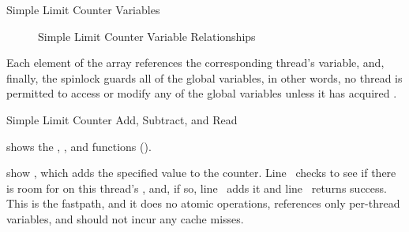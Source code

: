 \begin{listing}

\caption{Simple Limit Counter Variables}
\label{lst:count:Simple Limit Counter Variables}
\end{listing}

\begin{figure}
\centering
{}
\caption{Simple Limit Counter Variable Relationships}
\label{fig:count:Simple Limit Counter Variable Relationships}
\end{figure}

Each element of the  array references the corresponding
thread's  variable, and, finally, the 
spinlock guards all of the global variables, in other words, no thread
is permitted to access or modify any of the global variables unless it
has acquired .

\begin{listing}

\caption{Simple Limit Counter Add, Subtract, and Read}
\label{lst:count:Simple Limit Counter Add; Subtract; and Read}
\end{listing}

shows the , , and 
functions ().

\QuickQuizEnd

\begin{fcvref}
 show ,
which adds the specified value 
to the counter.
Line~ checks to see if there is room for
 on this thread's
, and, if so,
line~ adds it and line~ returns success.
This is the  fastpath, and it does no atomic operations,
references only per-thread variables, and should not incur any cache misses.
\end{fcvref}

